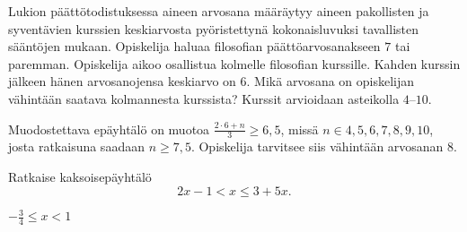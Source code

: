 \begin{tehtavasivu}
\begin{tehtava}
Lukion päättötodistuksessa aineen arvosana määräytyy aineen pakollisten ja syventävien kurssien keskiarvosta pyöristettynä kokonaisluvuksi tavallisten sääntöjen mukaan. Opiskelija haluaa filosofian päättöarvosanakseen $7$ tai paremman. Opiskelija aikoo osallistua kolmelle filosofian kurssille. Kahden kurssin jälkeen hänen arvosanojensa keskiarvo on $6$. Mikä arvosana on opiskelijan vähintään saatava kolmannesta kurssista? Kurssit arvioidaan asteikolla 
$4$--$10$.
\begin{vastaus}
Muodostettava epäyhtälö on muotoa $\frac{2\cdot 6+n}{3}\geq 6,5$, missä $n \in {4,5,6,7,8,9,10}$, josta ratkaisuna saadaan $n\geq 7,5$. Opiskelija tarvitsee siis vähintään arvosanan $8$.
\end{vastaus}
\end{tehtava}

\begin{tehtava}
Ratkaise kaksoisepäyhtälö
\[ 2x-1 < x \leq 3+5x.  \]
    \begin{vastaus}
        $-\frac{3}{4} \leq x < 1$
    \end{vastaus}
\end{tehtava}

\end{tehtavasivu}